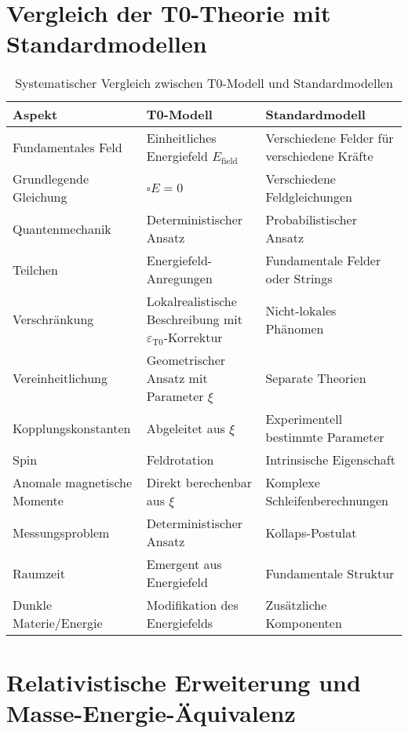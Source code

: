 \documentclass[12pt,a4paper]{article}
\newcommand{\efield}{E_{\text{field}}}
\newcommand{\epst}{\varepsilon_{\text{T0}}}
\theoremstyle{definition}
\begin{document}
	\section{Vergleich der T0-Theorie mit Standardmodellen}
	
	\begin{table}[h]
		\centering
		\begin{tabular}{p{3cm}p{5cm}p{5cm}}
			\toprule
			\textbf{Aspekt} & \textbf{T0-Modell} & \textbf{Standardmodell} \\
			\midrule
			Fundamentales Feld & Einheitliches Energiefeld $\efield$ & Verschiedene Felder für verschiedene Kräfte \\
			\addlinespace
			Grundlegende Gleichung & $\square E = 0$ & Verschiedene Feldgleichungen \\
			\addlinespace
			Quantenmechanik & Deterministischer Ansatz & Probabilistischer Ansatz \\
			\addlinespace
			Teilchen & Energiefeld-Anregungen & Fundamentale Felder oder Strings \\
			\addlinespace
			Verschränkung & Lokalrealistische Beschreibung mit $\epst$-Korrektur & Nicht-lokales Phänomen \\
			\addlinespace
			Vereinheitlichung & Geometrischer Ansatz mit Parameter $\xi$ & Separate Theorien \\
			\addlinespace
			Kopplungskonstanten & Abgeleitet aus $\xi$ & Experimentell bestimmte Parameter \\
			\addlinespace
			Spin & Feldrotation & Intrinsische Eigenschaft \\
			\addlinespace
			Anomale magnetische Momente & Direkt berechenbar aus $\xi$ & Komplexe Schleifenberechnungen \\
			\addlinespace
			Messungsproblem & Deterministischer Ansatz & Kollaps-Postulat \\
			\addlinespace
			Raumzeit & Emergent aus Energiefeld & Fundamentale Struktur \\
			\addlinespace
			Dunkle Materie/Energie & Modifikation des Energiefelds & Zusätzliche Komponenten \\
			\bottomrule
		\end{tabular}
		\caption{Systematischer Vergleich zwischen T0-Modell und Standardmodellen}
	\end{table}
	
	\section{Relativistische Erweiterung und Masse-Energie-Äquivalenz}
	
\end{document}
